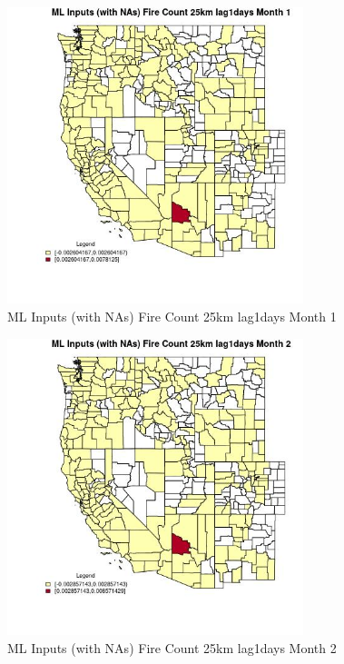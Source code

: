 \begin{figure} 
\centering  
\includegraphics[width=0.77\textwidth]{Code_Outputs/Report_ML_input_PM25_Step4_part_e_de_duplicated_aves_compiled_2019-05-20wNAs_CountyFire_Count_25km_lag1daysmedianMonth1.jpg} 
\caption{\label{fig:Report_ML_input_PM25_Step4_part_e_de_duplicated_aves_compiled_2019-05-20wNAsCountyFire_Count_25km_lag1daysmedianMonth1}ML Inputs (with NAs) Fire Count 25km lag1days Month 1} 
\end{figure} 
 

\begin{figure} 
\centering  
\includegraphics[width=0.77\textwidth]{Code_Outputs/Report_ML_input_PM25_Step4_part_e_de_duplicated_aves_compiled_2019-05-20wNAs_CountyFire_Count_25km_lag1daysmedianMonth2.jpg} 
\caption{\label{fig:Report_ML_input_PM25_Step4_part_e_de_duplicated_aves_compiled_2019-05-20wNAsCountyFire_Count_25km_lag1daysmedianMonth2}ML Inputs (with NAs) Fire Count 25km lag1days Month 2} 
\end{figure} 
 

